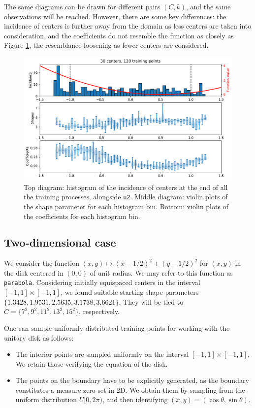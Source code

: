 \documentclass[12pt]{report} %
\begin{document}
The same diagrams can be drawn for different pairs $(C,k)$, and the same observations will be reached. However, there are some key differences: the incidence of centers is further away from the domain as less centers are taken into consideration, and the coefficients do not resemble the function as closely as Figure \ref{fig:u2-results-shapes-etc-c30-tr120}, the resemblance loosening as fewer centers are considered.

\begin{figure}
  \includegraphics[width=\textwidth]{imagenes/experiments/1d/statistical_1d_full_scheduler_interpolation/C30-TR120-u2.pdf}
  \caption{Top diagram: histogram of the incidence of centers at the end of all the training processes, alongside \texttt{u2}. Middle diagram: violin plots of the shape parameter for each histogram bin. Bottom: violin plots of the coefficients for each histogram bin.}
  \label{fig:u2-results-shapes-etc-c30-tr120}
\end{figure}



\clearpage
\subsection*{Two-dimensional case}

We consider the function $(x,y) \mapsto (x-1/2)^2 + (y-1/2)^2$ for $(x,y)$ in the disk centered in $(0,0)$ of unit radius. We may refer to this function as \texttt{parabola}. Considering initially equispaced centers in the interval $[-1,1]\times[-1,1]$, we found suitable starting shape parameters $\{1.3428, 1.9531, 2.5635, 3.1738, 3.6621\}$. They will be tied to $C=\{7^2,9^2,11^2,13^2,15^2\}$, respectively.

One can sample uniformly-distributed training points for working with the unitary disk as follows:
\begin{itemize}
  \item The interior points are sampled uniformly on the interval $[-1,1]\times[-1,1]$. We retain those verifying the equation of the disk.
  \item The points on the boundary have to be explicitly generated, as the boundary constitutes a measure zero set in 2D. We obtain them by sampling from the uniform distribution $U[0,2\pi)$, and then identifying $(x,y)=(\cos\theta, \sin\theta)$.
\end{itemize}
\end{document}
